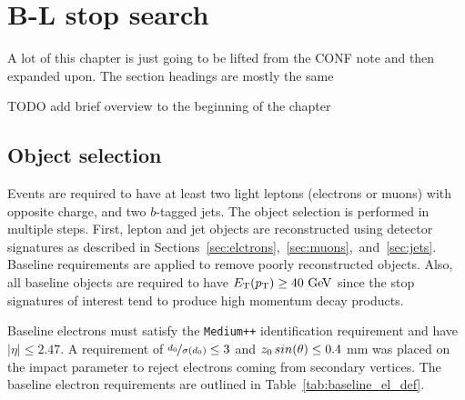 \chapter[B-L stop search][B-L stop search]{B-L stop search}
\label{ch:bl_stop}

{\color{red}A lot of this chapter is just going to be lifted from the CONF note
  and then expanded upon. The section headings are mostly the same}

{\color{red} TODO add brief overview to the beginning of the chapter}

\section{Object selection}
\label{sec:object_selection}

Events are required to have at least two light leptons (electrons or muons)
with opposite charge, and two $b$-tagged jets.
The object selection is performed in multiple steps. First, lepton and jet
objects are reconstructed using detector signatures as described in
Sections~\ref{sec:elctrons},~\ref{sec:muons},~and~\ref{sec:jets}.
Baseline requirements are applied to remove poorly reconstructed objects.
Also, all baseline objects are required to have $\ET(\pt) \geq 40 \GeV$ since the
stop signatures of interest tend to produce high momentum decay products.

Baseline electrons must satisfy the \texttt{Medium++} identification
requirement and have $|\eta| \leq 2.47$.
A requirement of $\nicefrac{d_0}{\sigma(d_0)} \leq 3$ and
$z_0\,sin(\theta) \leq 0.4$ mm
was placed on the impact parameter to reject electrons coming from secondary
vertices.
The baseline electron requirements are outlined in
Table~\ref{tab:baseline_el_def}.

\begin{table}[ht]
\caption{Baseline electron requirements.}
\label{tab:baseline_el_def}
\end{table}

